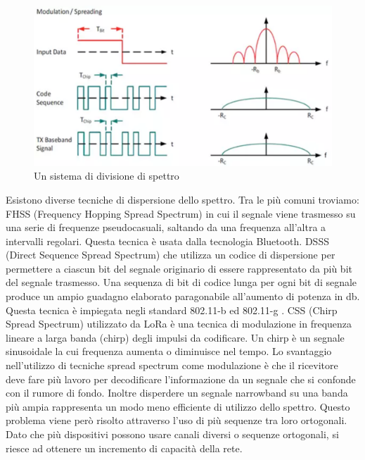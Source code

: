 \documentclass[12pt,a4paper,openright,twoside]{report}
\begin{document}
\begin{figure}[h]                      
\begin{center} 

\includegraphics[width=\textwidth]{spreading_factor.png}
\caption[Un sistema di divisione di spettro]{Un sistema di divisione di spettro}\label{fig:prima}
\end{center}
\end{figure}
Esistono diverse tecniche di dispersione dello spettro. Tra le pi\`u comuni troviamo: 
FHSS (Frequency Hopping Spread Spectrum) in cui il segnale viene trasmesso su una serie di frequenze pseudocasuali, saltando da una frequenza all'altra a intervalli regolari. Questa tecnica \`e usata dalla tecnologia Bluetooth.
DSSS (Direct Sequence Spread Spectrum) che utilizza un codice di dispersione per permettere a ciascun bit del segnale originario di essere rappresentato da pi\`u bit del segnale trasmesso. Una sequenza di bit di codice lunga per ogni bit di segnale produce un ampio guadagno elaborato paragonabile all'aumento di potenza in db. Questa tecnica \`e impiegata negli standard 802.11-b ed 802.11-g .
CSS (Chirp Spread Spectrum) utilizzato da LoRa \`e una  tecnica di modulazione in frequenza lineare a larga banda (chirp) degli impulsi da codificare. Un chirp \`e un segnale sinusoidale la cui frequenza aumenta o diminuisce nel tempo.
Lo svantaggio nell'utilizzo di tecniche spread spectrum come modulazione \`e che il ricevitore deve fare pi\`u lavoro per decodificare l'informazione da un segnale che si confonde con il rumore di fondo. Inoltre disperdere un segnale narrowband su una banda pi\`u ampia rappresenta un modo meno efficiente di utilizzo dello spettro. Questo problema viene per\`o risolto attraverso l'uso di pi\`u sequenze tra loro ortogonali. Dato che pi\`u dispositivi possono usare canali diversi o sequenze ortogonali, si riesce ad ottenere un incremento di capacit\`a della rete. 
\end{document}
